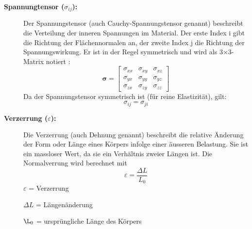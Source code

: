 \begin{description}
	\item[\textbf{Spannungtensor ($\sigma_{ij}$):}] Der Spannungstensor (auch Cauchy-Spannungstensor genannt) beschreibt die Verteilung der inneren Spannungen im Material. 
	Der erste Index	i gibt die Richtung der Flächennormalen an, der zweite Index j die Richtung der Spannungswirkung. 
	Er ist in der Regel symmetrisch und wird als 3×3-Matrix notiert \cite{elastomechanik:Grundlagen der Elastizitaetstheorie}:
	\begin{equation}
	\boldsymbol{\sigma} =
	\begin{bmatrix}
		\sigma_{xx} & \sigma_{xy} & \sigma_{xz} \\
		\sigma_{yx} & \sigma_{yy} & \sigma_{yz} \\
		\sigma_{zx} & \sigma_{zy} & \sigma_{zz}
	\end{bmatrix}
	\end{equation}
	Da der Spannungstensor symmetrisch ist (für reine Elastizität), gilt:
	\begin{equation}
		\sigma_{ij} = 
		\sigma_{ji}
	\end{equation}
	\item[\textbf{Verzerrung ($\varepsilon$):}] Die Verzerrung (auch Dehnung genannt) beschreibt die relative Änderung der Form oder Länge eines Körpers infolge einer äusseren Belastung. 
	Sie ist ein massloser Wert, da sie ein Verhältnis zweier Längen ist.
	Die Normalverrung wird berechnet mit
	\begin{equation}
		\varepsilon 
		= \frac{\Delta L}{L_0}
	\end{equation}
	$\varepsilon$ = Verzerrung
	
	$\Delta L$ = Längenänderung
	
	$\L_0$ = ursprüngliche Länge des Körpers
	

\end{description}

